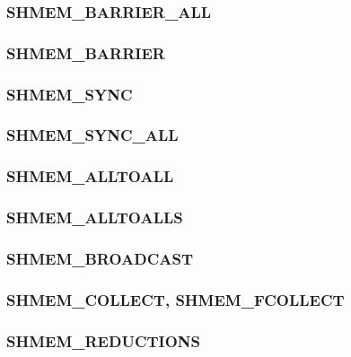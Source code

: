 \documentclass[10pt,oneside]{book}
\begin{document}
\subsubsection{\textbf{SHMEM\_BARRIER\_ALL}}\label{subsec:shmem_barrier_all}


\subsubsection{\textbf{SHMEM\_BARRIER}}\label{subsec:shmem_barrier}


\subsubsection{\textbf{SHMEM\_SYNC}}\label{subsec:shmem_sync}


\subsubsection{\textbf{SHMEM\_SYNC\_ALL}}\label{subsec:shmem_sync_all}


\subsubsection{\textbf{SHMEM\_ALLTOALL}}\label{subsec:shmem_alltoall}


\subsubsection{\textbf{SHMEM\_ALLTOALLS}}\label{subsec:shmem_alltoalls}


\subsubsection{\textbf{SHMEM\_BROADCAST}}\label{subsec:shmem_broadcast}


\subsubsection{\textbf{SHMEM\_COLLECT, SHMEM\_FCOLLECT}}\label{subsec:shmem_collect}


\subsubsection{\textbf{SHMEM\_REDUCTIONS}}\label{subsec:shmem_reductions}

\end{document}

